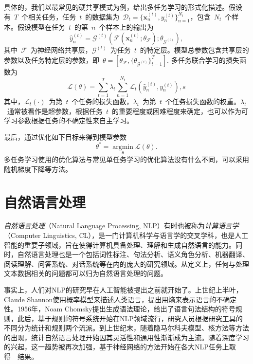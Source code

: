 具体的，我们以最常见的硬共享模式为例，给出多任务学习的形式化描述。假设有~$T$~个相关任务，任务~$t$~的数据集为~$\mathcal{D}_t = \lbrace \mathbf{x}_n^{(t)}, y_n^{(t)} \rbrace_{n=1}^{N_t}$，包含~$N_t$~个样本。假设模型在任务~$t$~的第~$n$~个样本上的输出为
\begin{equation}
	\hat{y}_n^{(t)} = \mathcal{G}^{(t)}(\mathcal{F}(\mathbf{x}_n^{(t)}; \theta_\mathcal{F}) ; \theta_{\mathcal{G}^{(t)}}),
\end{equation}
其中~$\mathcal{F}$~为神经网络共享层，$\mathcal{G}^{(t)}$~为任务~$t$~的特定层。模型总参数包含共享层的参数以及任务特定层的参数，即~$\theta = [\theta_\mathcal{F}, \{ \theta_{\mathcal{G}^{(t)}}\}_{t=1}^T]$. 多任务联合学习的损失函数为
\begin{equation}
	\mathcal{L}(\theta) = \sum_{t=1}^T\lambda_t\sum_{n=1}^{N_t}\mathcal{L}_t(\hat{y}_n^{(t)}, y_n^{(t)}),
s\end{equation}
其中，$\mathcal{L}_t(\cdot)$~为第~$t$~个任务的损失函数，$\lambda_t$~为第~$t$~个任务损失函数的权重。$\lambda_t$~通常被看作是超参数，根据任务~$t$~的重要程度或困难程度来确定，也可以作为可学习参数根据任务的不确定性来自主学习\cite{DBLP:conf/cvpr/KendallGC18}。

最后，通过优化如下目标来得到模型参数
\begin{equation}
	\theta ^* = \mathop{\arg\min}\limits_{\theta} \mathcal{L}(\theta).
\end{equation}
多任务学习使用的优化算法与常见单任务学习的优化算法没有什么不同，可以采用随机梯度下降等方法。
\section{自然语言处理}
\label{sec:nlp}

\emph{自然语言处理}（Natural Language Processing, NLP）有时也被称为\emph{计算语言学}（Computer Linguistics, CL），是一门计算机科学与语言学的交叉学科，也是人工智能的重要子领域，旨在使得计算机具备处理、理解和生成自然语言的能力。同时，自然语言处理也是一个包括词性标注、句法分析、语义角色分析、机器翻译、阅读理解、问答系统、对话系统等在内的庞大的研究领域。从定义上，任何与处理文本数据相关的问题都可以归为自然语言处理的问题。

事实上，人们对NLP的研究早在人工智能被提出之前就开始了。上世纪上半叶，Claude Shannon使用概率模型来描述人类语言，提出用熵来表示语言的不确定性。1956年，Noam Chomsky提出生成语法理论，给出了语言句法结构的符号规则，此后，基于规则的符号系统开始在NLP领域流行，研究人员根据研究工具的不同分为统计和规则两个流派。到上世纪末，随着隐马尔科夫模型、核方法等方法的出现，统计自然语言处理开始因其灵活性和通用性渐渐成为主流。随着深度学习的兴起，这一趋势被再次加强，基于神经网络的方法开始在各大NLP任务上取得~\sArt~结果。

